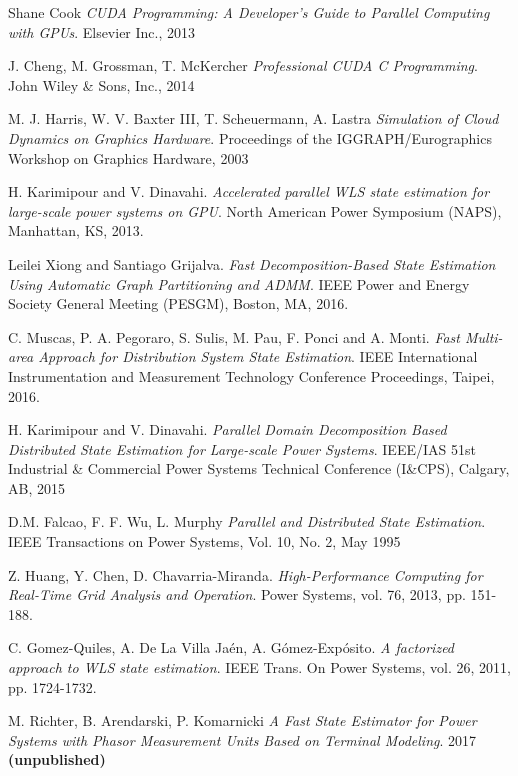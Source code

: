 \documentclass[fontsize=12pt, paper=a4, headinclude, twoside=false, parskip=half+, pagesize=auto, numbers=noenddot, headsepline, footsepline, open=right, toc=listof, toc=bibliography]{scrreprt}
\begin{document}
\begin{thebibliography}{9}
	Shane Cook  
	\textit{CUDA Programming: A Developer’s Guide to Parallel Computing with GPUs}. 
	Elsevier Inc., 2013
	
	
	J. Cheng, M. Grossman, T. McKercher
	\textit{Professional CUDA C Programming}. 
	John Wiley \& Sons, Inc., 2014
	

	M. J. Harris, W. V. Baxter III, T. Scheuermann, A. Lastra
	\textit{Simulation of Cloud Dynamics on Graphics Hardware}. 
	Proceedings of the IGGRAPH/Eurographics Workshop on Graphics Hardware, 2003
	
	
	H. Karimipour and V. Dinavahi. 
	\textit{Accelerated parallel WLS state estimation for large-scale power systems on GPU}. 
	North American Power Symposium (NAPS), Manhattan, KS, 2013.
	
	Leilei Xiong and Santiago Grijalva.
	\textit{Fast Decomposition-Based State Estimation Using Automatic Graph Partitioning and ADMM}. 
	IEEE Power and Energy Society General Meeting (PESGM), Boston, MA, 2016.
	
	C. Muscas, P. A. Pegoraro, S. Sulis, M. Pau, F. Ponci and A. Monti.
	\textit{Fast Multi-area Approach for Distribution System State Estimation}. 
	IEEE International Instrumentation and Measurement Technology Conference Proceedings, Taipei, 2016.
	
	
	H. Karimipour and V. Dinavahi.
	\textit{Parallel Domain Decomposition Based Distributed State Estimation for Large-scale Power Systems}. 
	IEEE/IAS 51st Industrial \& Commercial Power Systems Technical Conference (I\&CPS), Calgary, AB, 2015
	

	D.M. Falcao, F. F. Wu, L. Murphy
	\textit{Parallel and Distributed State Estimation}. 
	IEEE Transactions on Power Systems, Vol. 10, No. 2, May 1995 
	
	Z. Huang, Y. Chen, D. Chavarria-Miranda.
	\textit{High-Performance Computing for Real-Time Grid Analysis and Operation}. 
	Power Systems, vol. 76, 2013, pp. 151-188.
	
	C. Gomez-Quiles, A. De La Villa Jaén, A. Gómez-Expósito.
	\textit{A factorized approach to WLS state estimation}. 
	IEEE Trans. On Power Systems, vol. 26, 2011, pp. 1724-1732.
	
	
	M. Richter, B. Arendarski, P. Komarnicki
	\textit{A Fast State Estimator for Power Systems with Phasor Measurement Units Based on Terminal Modeling}. 
	2017 \textbf{(unpublished)}
	

\end{thebibliography}
\end{document}
